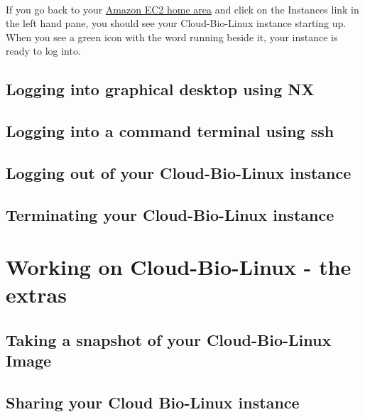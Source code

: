 \paragraph{}If you go back to your \href{http://console.aws.amazon.com/ec2/home}{Amazon EC2 home area} and click on the Instances link in the left hand pane, you should see your Cloud-Bio-Linux instance starting up. When you see a green icon with the word running beside it, your instance is ready to log into.

\subsection{Logging into graphical desktop using NX}


\subsection{Logging into a command terminal using ssh}

\subsection{Logging out of your Cloud-Bio-Linux instance}

\subsection{Terminating your Cloud-Bio-Linux instance}





\section{Working on Cloud-Bio-Linux - the extras}

\subsection{Taking a snapshot of your Cloud-Bio-Linux Image}
\subsection{Sharing your Cloud Bio-Linux instance}

